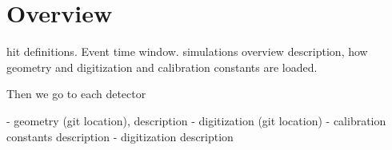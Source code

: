 \section{Overview}


hit definitions. Event time window.
simulations overview description, how geometry and digitization and calibration constants are loaded.

Then we go to each detector

- geometry (git location), description
- digitization (git location)
- calibration constants description
- digitization description




